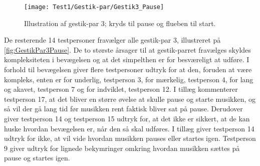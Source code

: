 %
\begin{figure}[H]
	\centering
	\texttt{[image: Test1/Gestik-par/Gestik3\_Pause]}
	\caption{Illustration af gestik-par 3; kryds til pause og flueben til start.}
	\label{fig:GestikPar3Pause}
\end{figure}
\noindent
% 
De resterende 14 testpersoner fravælger alle gestik-par 3, illustreret på \autoref{fig:GestikPar3Pause}. De to største årsager til at gestik-parret fravælges skyldes kompleksiteten i bevægelsen og at det simpelthen er for besværeligt at udføre. I forhold til bevægelsen giver flere testpersoner udtryk for at den, foruden at være kompleks, enten er for underlig, testperson 3, for mærkelig, testperson 4, for lang og akavet, testperson 7 og for indviklet, testperson 12. I tillæg kommenterer testperson 17, at det bliver en større øvelse at skulle pause og starte musikken, og så vil der gå lang tid før musikken rent faktisk bliver sat på pause. Derudover giver testperson 14 og testperson 15 udtryk for, at det ikke er sikkert, at de kan huske hvordan bevægelsen er, når den så skal udføres. I tillæg giver testperson 14 udtryk for ikke, at vil vide hvordan musikken pauses eller startes igen. Testperson 9 giver udtryk for lignede bekymringer omkring hvordan musikken sættes på pause og startes igen.

